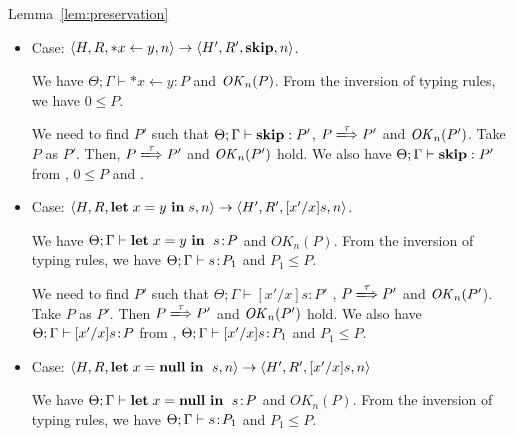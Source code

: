 \begin{pfof}{Lemma~\ref{lem:preservation}}
\begin{itemize}
  we have \(\Theta;\Gamma \vdash \SKIP;s\COL  P\) and
  \(\OK_{n}(P)\). From the inversion of the typing rules, we have
  \(\Theta; \Gamma \vdash s\COL P_{1}\) and \(0;P_{1} \le
  P\). Hence, from the definition of subtyping, we have \(P
  \xLongrightarrow{\tau} P''\) and \(P_{1} \le P''\) for some \(P''\).

  We need to find \(P'\) such that \(\Theta; \Gamma \vdash s : P'\)
  and \(P \xLongrightarrow{\tau} P'\). Take \(P''\) as \(P'\). Then \(P
  \xLongrightarrow{\tau} P''\) as we stated above. We also have
  \(\Theta;\Gamma \vdash s\COL P''\) from , \(\Gamma \vdash
  s\COL P_{1}\) and \(P_{1} \le P''\). \(\OK_n(P'')\) follows from
  Lemma~\ref{lem:okPreserved}

\item Case: $\langle H, R, *x \leftarrow y , n \rangle \rightarrow
  \langle H', R', \mathbf{skip}, n \rangle $.

  We have \(\Theta; \Gamma \vdash *x \leftarrow y : P\) and
  \(\OK_{n}(P)\). From the inversion of typing rules, we have \(0 \le
  P\).

  We need to find $P'$ such that \(\Theta; \Gamma \vdash \mathbf{skip}: P'\),
  \(P \xLongrightarrow{\tau} P'\) and \(\mathit{OK}_n(P')\). Take $P$ as $P'$. Then,
  \(P \xLongrightarrow{\tau} P'\) and \(\mathit{OK}_n(P')\) hold. We also have \(\Theta;
  \Gamma \vdash \mathbf{skip}: P'\) from , \(0 \le P\) and
  .

\item Case: $\langle H, R, \mathbf{let}\; x = y\ \mathbf{in}\; s , n \rangle
  \rightarrow \langle H', R', [x'/x]s, n \rangle $.

  We have \(\Theta; \Gamma \vdash \LET x = y\ \IN \ s \COL P\) and
  \(OK_{n}(P)\). From the inversion of typing rules, we have \(\Theta;
  \Gamma \vdash s\COL P_{1}\) and \(P_{1} \le P\).

  We need to find $P'$ such that \(\Theta; \Gamma \vdash [x'/x]s : P'\) ,
  \(P \xLongrightarrow{\tau} P'\) and \(\mathit{OK}_n(P'\)). Take \(P\) as
  \(P'\). Then \( P \xLongrightarrow{\tau} P'\) and \(\mathit{OK}_n(P')\) hold.  We
  also have \(\Theta; \Gamma \vdash [x'/x]s\!:\! P\) from ,
  \(\Theta; \Gamma \vdash [x'/x]s\!:\! P_{1}\) and \( P_{1} \le
  P\).

\item Case: $\langle H, R, \LET x = \NULL \ \IN \ s, n \rangle
  \rightarrow \langle H', R', [x'/x]s, n \rangle $

  We have \(\Theta; \Gamma \vdash \mathbf{let}\; x = \mathbf{null} \ \mathbf{in}\; \ s\!:\! P\)
  and \(OK_{n}(P)\). From the inversion of typing rules, we have
  \(\Theta; \Gamma \vdash s\COL P_{1}\) and \( P_{1} \le P\).


\end{itemize}
\end{pfof}
